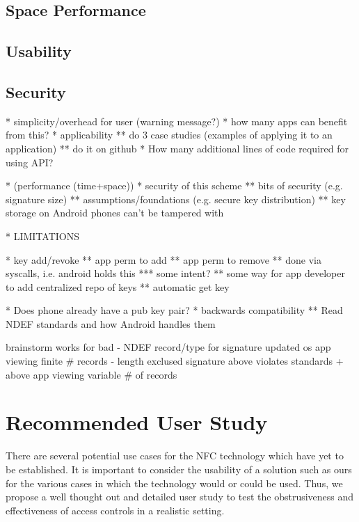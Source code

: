 \documentclass[12pt]{article}
\begin{document}
\subsection{Space Performance}
\subsection{Usability}
\subsection{Security}
* simplicity/overhead for user (warning message?)
* how many apps can benefit from this?
* applicability
** do 3 case studies (examples of applying it to an application)
** do it on github
* How many additional lines of code required for using API?

* (performance (time+space))
* security of this scheme
** bits of security (e.g. signature size)
** assumptions/foundations (e.g. secure key distribution)
** key storage on Android phones can't be tampered with

* LIMITATIONS

* key add/revoke
** app perm to add
** app perm to remove
** done via syscalls, i.e. android holds this
*** some intent?
** some way for app developer to add centralized repo of keys
** automatic get key

* Does phone already have a pub key pair?
* backwards compatibility
** Read NDEF standards and how Android handles them

brainstorm                         works for                           bad
- NDEF record/type for signature   updated os
                                   app viewing finite \# records
- length exclused signature        above                               violates standards
  + above                          app viewing variable \# of records   



\section{Recommended User Study}
There are several potential use cases for the NFC technology which have yet to be established. It is important to consider the usability of a solution such as ours for the various cases in which the technology would or could be used. Thus, we propose a well thought out and detailed user study to test the obstrusiveness and effectiveness of access controls in a realistic setting. 
\end{document}
